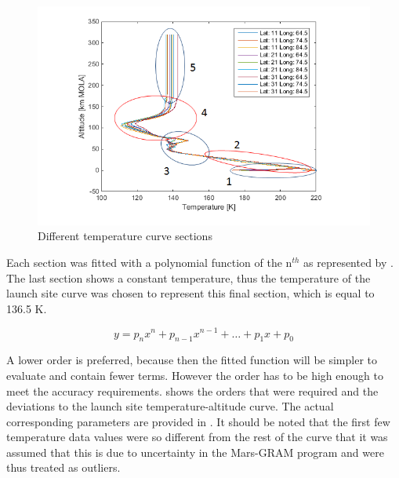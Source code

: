 \begin{figure}[H]
\centering
\includegraphics[width=1.0\textwidth]{figures/software/temperatureDataSplit5.png}
\caption{Different temperature curve sections}
\label{fig:temperatureDataSplit5}
\end{figure}

\noindent
Each section was fitted with a polynomial function of the n$^{th}$ as represented by . The last section shows a constant temperature, thus the temperature of the launch site curve was chosen to represent this final section, which is equal to 136.5 K.

\begin{equation} \label{eq:polyGenFunct}
y=p_{n}x^{n}+p_{n-1}x^{n-1}+\dots+p_{1}x+p_{0}
\end{equation}

\noindent
A lower order is preferred, because then the fitted function will be simpler to evaluate and contain fewer terms. However the order has to be high enough to meet the accuracy requirements.  shows the orders that were required and the deviations to the launch site temperature-altitude curve. The actual corresponding parameters are provided in . It should be noted that the first few temperature data values were so different from the rest of the curve that it was assumed that this is due to uncertainty in the Mars-\ac{GRAM} program and were thus treated as outliers.

